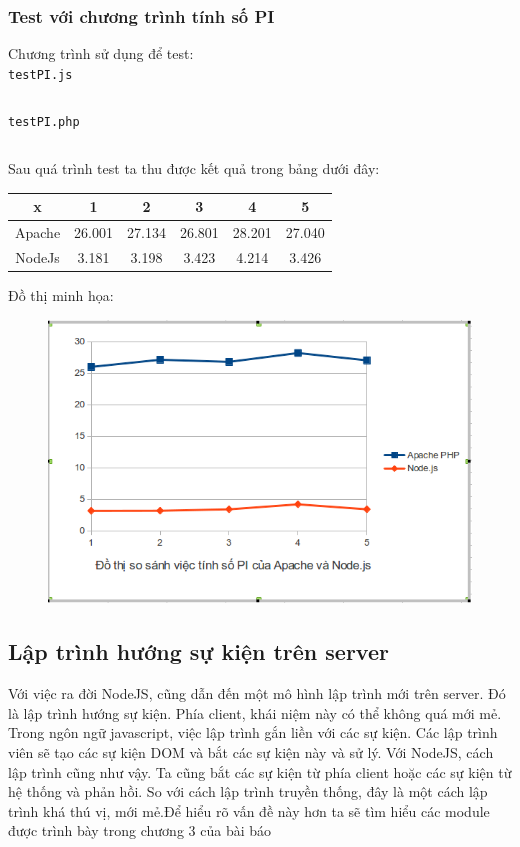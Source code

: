 \subsubsection*{Test với chương trình tính số PI}
	Chương trình sử dụng để test:\\
\texttt{testPI.js}
		\begin{framed}
			\inputminted[tabsize=4, linenos=true]{javascript}{testPI.js}
		\end{framed}

\texttt{testPI.php}
		\begin{framed}
			\inputminted[tabsize=4, linenos=true]{php}{testPi.php}
		\end{framed}

Sau quá trình test ta thu được kết quả trong bảng dưới đây:	\\
	\begin{tabular}{|c|c|c|c|c|c|}
		\hline
		x & 1 & 2 & 3 & 4 & 5 \\
		\hline
		Apache & 26.001 & 27.134 & 26.801 & 28.201 & 27.040 \\
		\hline
		NodeJs & 3.181 & 3.198 & 3.423 & 4.214 & 3.426
		\\ \hline
	\end{tabular}


Đồ thị minh họa:\\
	\begin{figure}[-h]
		\centering
		\includegraphics[scale=0.6]{1_2.png}
	\end{figure}



\subsection{Lập trình hướng sự kiện trên server}
	Với việc ra đời NodeJS, cũng dẫn đến một mô hình lập trình mới trên server. Đó là lập trình hướng sự kiện. Phía client, khái niệm này có thể không quá mới mẻ. Trong ngôn ngữ javascript, việc lập trình gắn liền với các sự kiện. Các lập trình viên sẽ tạo các sự kiện DOM và bắt các sự kiện này và sử lý. Với NodeJS, cách lập trình cũng như vậy. Ta cũng bắt các sự kiện từ phía client hoặc các sự kiện từ hệ thống và phản hồi. So với cách lập trình truyền thống, đây là một cách lập trình khá thú vị, mới mẻ.Để hiểu rõ vấn đề này hơn ta sẽ tìm hiểu các module được trình bày trong chương 3 của bài báo
